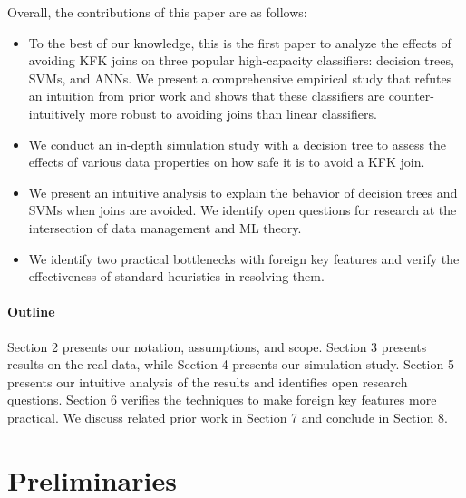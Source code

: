 \documentclass{vldb}
\newenvironment{packeditems}{
\begin{itemize}
  \setlength{\itemsep}{1pt}
  \setlength{\parskip}{0pt}
  \setlength{\parsep}{0pt}
}{\end{itemize}}
\begin{document}
\vspace{1mm}
\noindent Overall, the contributions of this paper are as follows:

\begin{packeditems}
\item To the best of our knowledge, this is the first paper to analyze the effects of avoiding KFK joins on three popular 
high-capacity classifiers: decision trees, SVMs, and ANNs.
We present a comprehensive empirical study that refutes an intuition from prior work and shows that these classifiers 
are counter-intuitively more robust to avoiding joins than linear classifiers.

\item We conduct an in-depth simulation study with a decision tree to assess the effects of various data properties on
how safe it is to avoid a KFK join.

\item We present an intuitive analysis to explain the behavior of decision trees and SVMs when joins are avoided. We identify 
open questions for research at the intersection of data management and ML theory.

\item We identify two practical bottlenecks with foreign key features and verify the effectiveness of standard heuristics in resolving them.
\end{packeditems}

\vspace{-3mm}
\paragraph*{\textbf{Outline}} Section 2 presents our notation, assumptions, and scope. 
Section 3 presents results on the real data, while Section 4 presents our simulation study. Section 5 presents 
our intuitive analysis of the results and identifies open research questions.
Section 6 verifies the techniques to make foreign key features more practical. 
We discuss related prior work in Section 7 and conclude in Section 8.

\section{Preliminaries}
\end{document}
